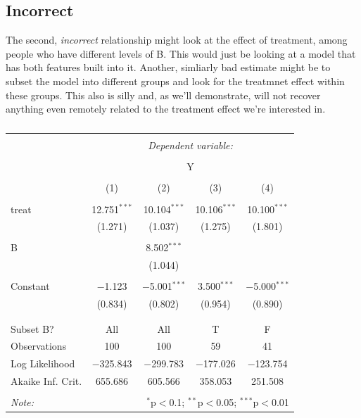 \documentclass[
]{book}
\begin{document}
\hypertarget{incorrect}{%
\subsection{Incorrect}\label{incorrect}}

The second, \emph{incorrect} relationship might look at the effect of
treatment, among people who have different levels of B. This would just
be looking at a model that has both features built into it. Another,
simliarly bad estimate might be to subset the model into different
groups and look for the treatmnet effect within these groups. This also
is silly and, as we'll demonstrate, will not recover anything even
remotely related to the treatment effect we're interested in.

\begin{table}[!htbp] \centering 
  \caption{} 
  \label{} 
\begin{tabular}{@{\extracolsep{5pt}}lcccc} 
\\[-1.8ex]\hline 
\hline \\[-1.8ex] 
 & \multicolumn{4}{c}{\textit{Dependent variable:}} \\ 
\cline{2-5} 
\\[-1.8ex] & \multicolumn{4}{c}{Y} \\ 
\\[-1.8ex] & (1) & (2) & (3) & (4)\\ 
\hline \\[-1.8ex] 
 treat & 12.751$^{***}$ & 10.104$^{***}$ & 10.106$^{***}$ & 10.100$^{***}$ \\ 
  & (1.271) & (1.037) & (1.275) & (1.801) \\ 
  & & & & \\ 
 B &  & 8.502$^{***}$ &  &  \\ 
  &  & (1.044) &  &  \\ 
  & & & & \\ 
 Constant & $-$1.123 & $-$5.001$^{***}$ & 3.500$^{***}$ & $-$5.000$^{***}$ \\ 
  & (0.834) & (0.802) & (0.954) & (0.890) \\ 
  & & & & \\ 
\hline \\[-1.8ex] 
Subset B? & All & All & T & F \\ 
Observations & 100 & 100 & 59 & 41 \\ 
Log Likelihood & $-$325.843 & $-$299.783 & $-$177.026 & $-$123.754 \\ 
Akaike Inf. Crit. & 655.686 & 605.566 & 358.053 & 251.508 \\ 
\hline 
\hline \\[-1.8ex] 
\textit{Note:}  & \multicolumn{4}{r}{$^{*}$p$<$0.1; $^{**}$p$<$0.05; $^{***}$p$<$0.01} \\ 
\end{tabular} 
\end{table}
\end{document}
